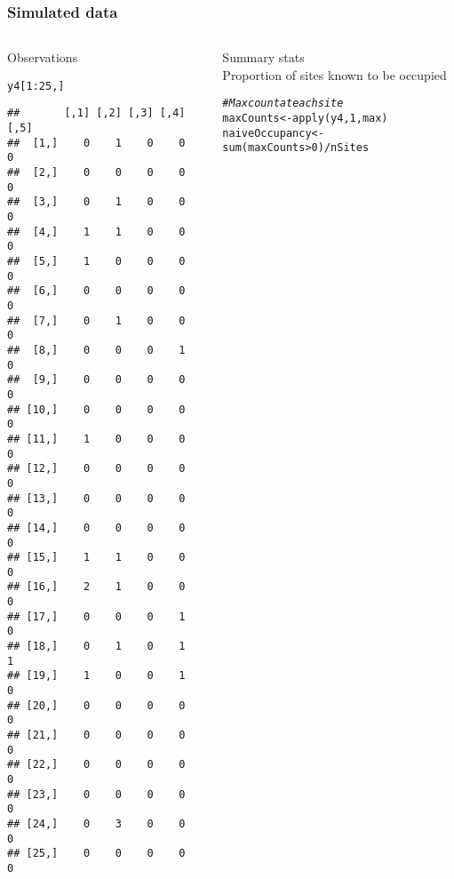 \documentclass[color=usenames,dvipsnames]{beamer}\usepackage[]{graphicx}\usepackage[]{color}
\makeatletter
\newcommand{\hlnum}[1]{\textcolor[rgb]{0.69,0.494,0}{#1}}%
\newcommand{\hlcom}[1]{\textcolor[rgb]{0.514,0.506,0.514}{\textit{#1}}}%
\newcommand{\hlopt}[1]{\textcolor[rgb]{0,0,0}{#1}}%
\newcommand{\hlstd}[1]{\textcolor[rgb]{0,0,0}{#1}}%
\newcommand{\hlkwb}[1]{\textcolor[rgb]{0,0.341,0.682}{#1}}%
\newcommand{\hlkwd}[1]{\textcolor[rgb]{0.004,0.004,0.506}{#1}}%
\newenvironment{kframe}{%
 \def\at@end@of@kframe{}%
 \ifinner\ifhmode%
  \def\at@end@of@kframe{\end{minipage}}%
  \begin{minipage}{\columnwidth}%
 \fi\fi%
 \def\FrameCommand##1{\hskip\@totalleftmargin \hskip-\fboxsep
 \colorbox{shadecolor}{##1}\hskip-\fboxsep
     \hskip-\linewidth \hskip-\@totalleftmargin \hskip\columnwidth}%
 \MakeFramed {\advance\hsize-\width
   \@totalleftmargin\z@ \linewidth\hsize
   \@setminipage}}%
 {\par\unskip\endMakeFramed%
 \at@end@of@kframe}
\newenvironment{knitrout}{}{} %
\makeatother
\begin{document}
\begin{frame}[fragile]
  \frametitle{Simulated data}
  \begin{columns}
    \begin{column}{0.4\textwidth}
      \small
      Observations
  \vspace{-6pt}
\begin{knitrout}\tiny
{}\color{fgcolor}\begin{kframe}
\begin{alltt}
\hlstd{y4[}\hlnum{1}\hlopt{:}\hlnum{25}\hlstd{,]}
\end{alltt}
\begin{verbatim}
##       [,1] [,2] [,3] [,4] [,5]
##  [1,]    0    1    0    0    0
##  [2,]    0    0    0    0    0
##  [3,]    0    1    0    0    0
##  [4,]    1    1    0    0    0
##  [5,]    1    0    0    0    0
##  [6,]    0    0    0    0    0
##  [7,]    0    1    0    0    0
##  [8,]    0    0    0    1    0
##  [9,]    0    0    0    0    0
## [10,]    0    0    0    0    0
## [11,]    1    0    0    0    0
## [12,]    0    0    0    0    0
## [13,]    0    0    0    0    0
## [14,]    0    0    0    0    0
## [15,]    1    1    0    0    0
## [16,]    2    1    0    0    0
## [17,]    0    0    0    1    0
## [18,]    0    1    0    1    1
## [19,]    1    0    0    1    0
## [20,]    0    0    0    0    0
## [21,]    0    0    0    0    0
## [22,]    0    0    0    0    0
## [23,]    0    0    0    0    0
## [24,]    0    3    0    0    0
## [25,]    0    0    0    0    0
\end{verbatim}
\end{kframe}
\end{knitrout}
  \end{column}
  \begin{column}{0.6\textwidth}
    \pause
    {\centering Summary stats \\}
    \vspace{24pt}
    \small
    Proportion of sites known to be occupied
    \vspace{-6pt}
\begin{knitrout}\scriptsize
{}\color{fgcolor}\begin{kframe}
\begin{alltt}
\hlcom{# Max count at each site}
\hlstd{maxCounts} \hlkwb{<-} \hlkwd{apply}\hlstd{(y4,} \hlnum{1}\hlstd{, max)}
\hlstd{naiveOccupancy} \hlkwb{<-} \hlkwd{sum}\hlstd{(maxCounts}\hlopt{>}\hlnum{0}\hlstd{)}\hlopt{/}\hlstd{nSites}

\end{alltt}
\end{kframe}
\end{knitrout}
\end{column}
\end{columns}
\end{frame}
\end{document}
